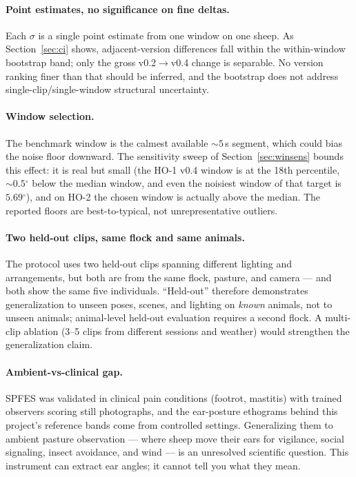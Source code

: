 \documentclass[11pt]{article}
\newcommand{\dgr}{\ensuremath{^{\circ}}}
\begin{document}
\paragraph{Point estimates, no significance on fine deltas.} Each $\sigma$ is a
single point estimate from one window on one sheep. As Section~\ref{sec:ci}
shows, adjacent-version differences fall within the within-window bootstrap
band; only the gross v0.2$\rightarrow$v0.4 change is separable. No version
ranking finer than that should be inferred, and the bootstrap does not address
single-clip/single-window structural uncertainty.

\paragraph{Window selection.} The benchmark window is the calmest available
${\sim}5$\,s segment, which could bias the noise floor downward. The sensitivity
sweep of Section~\ref{sec:winsens} bounds this effect: it is real but small (the
HO-1 v0.4 window is at the 18th percentile, ${\sim}0.5\dgr$ below the median
window, and even the noisiest window of that target is $5.69\dgr$), and on HO-2
the chosen window is actually above the median. The reported floors are
best-to-typical, not unrepresentative outliers.

\paragraph{Two held-out clips, same flock and same animals.} The protocol uses
two held-out clips spanning different lighting and arrangements, but both are
from the same flock, pasture, and camera --- and both show the same five
individuals. ``Held-out'' therefore demonstrates generalization to unseen poses,
scenes, and lighting on \emph{known} animals, not to unseen animals;
animal-level held-out evaluation requires a second flock. A multi-clip ablation
(3--5 clips from different sessions and weather) would strengthen the
generalization claim.

\paragraph{Ambient-vs-clinical gap.} SPFES \citep{mclennan2016} was validated in
clinical pain conditions (footrot, mastitis) with trained observers scoring
still photographs, and the ear-posture ethograms behind this project's reference
bands \citep{reefmann2009,boissy2011} come from controlled settings.
Generalizing them to ambient pasture observation --- where sheep move their ears
for vigilance, social signaling, insect avoidance, and wind --- is an unresolved
scientific question. This instrument can extract ear angles; it cannot tell you
what they mean.
\end{document}
